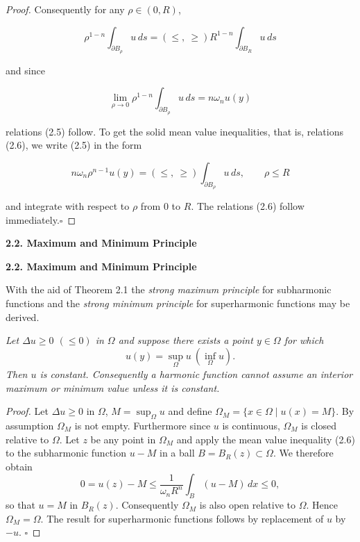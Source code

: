 \begin{theorem}
\begin{proof}
\noindent Consequently for any $\rho \in (0, R)$,

\begin{equation*}
\rho^{1-n}\int_{\partial B_\rho} u\,ds = (\leq,\ \geq) R^{1-n}\int_{\partial B_R} u\,ds
\end{equation*}

\noindent and since

\begin{equation*}
\lim_{\rho \to 0} \rho^{1-n}\int_{\partial B_\rho} u\,ds = n\omega_n u(y)
\end{equation*}

\noindent relations (2.5) follow. To get the solid mean value inequalities, that is, relations (2.6), we write (2.5) in the form

\begin{equation*}
n\omega_n \rho^{n-1}u(y) = (\leq,\ \geq)\int_{\partial B_\rho} u\,ds,\qquad \rho \leq R
\end{equation*}

\noindent and integrate with respect to $\rho$ from $0$ to $R$. The relations (2.6) follow immediately.\hfill$\square$
\end{proof}
\end{theorem}



\noindent\textbf{2.2. Maximum and Minimum Principle}

\medskip

\noindent\textbf{2.2. Maximum and Minimum Principle}

\medskip

With the aid of Theorem 2.1 the \emph{strong maximum principle} for subharmonic functions and the \emph{strong minimum principle} for superharmonic functions may be derived.

\medskip

\begin{theorem}\label{gt.thm2.2}
\emph{Let $\Delta u \geq 0$ $(\leq 0)$ in $\Omega$ and suppose there exists a point $y \in \Omega$ for which}
\[
u(y)=\sup_{\Omega} u \ (\inf_{\Omega} u).
\]
\emph{Then $u$ is constant. Consequently a harmonic function cannot assume an interior maximum or minimum value unless it is constant.}

\medskip

\begin{proof}
Let $\Delta u \geq 0$ in $\Omega$, $M=\sup_{\Omega} u$ and define $\Omega_M=\{x\in \Omega \mid u(x)=M\}$. By assumption $\Omega_M$ is not empty. Furthermore since $u$ is continuous, $\Omega_M$ is closed relative to $\Omega$. Let $z$ be any point in $\Omega_M$ and apply the mean value inequality (2.6) to the subharmonic function $u-M$ in a ball $B=B_R(z)\subset\Omega$. We therefore obtain
\[
0=u(z)-M\leq \frac{1}{\omega_n R^n}\int_B (u-M)\, dx\leq 0,
\]
so that $u=M$ in $B_R(z)$. Consequently $\Omega_M$ is also open relative to $\Omega$. Hence $\Omega_M=\Omega$.
The result for superharmonic functions follows by replacement of $u$ by $-u$. \hfill $\square$
\end{proof}
\end{theorem}

